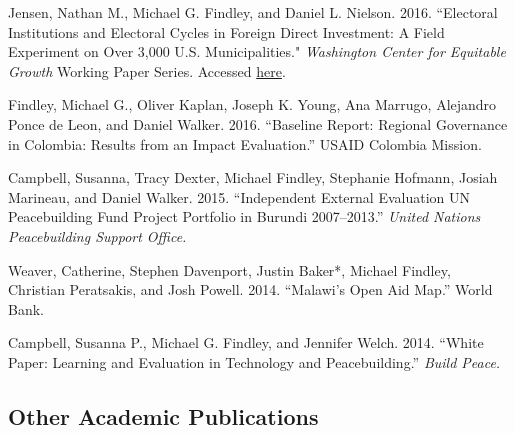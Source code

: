 \documentclass[10pt]{article}
\begin{document}
\begin{etaremune}
\item Jensen, Nathan M., Michael G. Findley, and Daniel L. Nielson. 2016. ``Electoral Institutions and Electoral Cycles in Foreign Direct Investment: A Field Experiment on Over 3,000 U.S. Municipalities." \textit{Washington Center for Equitable Growth} Working Paper Series. Accessed \href{http://equitablegrowth.org/electoral-institutions-and-electoral-cycles-in-foreign-direct-investment/}{here}. 

\item Findley, Michael G., Oliver Kaplan, Joseph K. Young, Ana Marrugo, Alejandro Ponce de Leon, and Daniel Walker. 2016. ``Baseline Report: Regional Governance in Colombia: Results from an Impact Evaluation.'' USAID Colombia Mission. 

\item Campbell, Susanna, Tracy Dexter, Michael Findley, Stephanie Hofmann, Josiah Marineau, and Daniel Walker. 2015. ``Independent External Evaluation UN Peacebuilding Fund Project Portfolio in Burundi 2007--2013.'' \textit{United Nations Peacebuilding Support Office.} 

\item Weaver, Catherine, Stephen Davenport, Justin Baker*, Michael Findley, Christian Peratsakis, and Josh Powell. 2014. ``Malawi's Open Aid Map.'' World Bank.

\item Campbell, Susanna P., Michael G. Findley, and Jennifer Welch. 2014. ``White Paper:  Learning and Evaluation in Technology and Peacebuilding.'' \textit{Build Peace.}

\end{etaremune}

\subsection*{Other Academic Publications}    %
\end{document}
